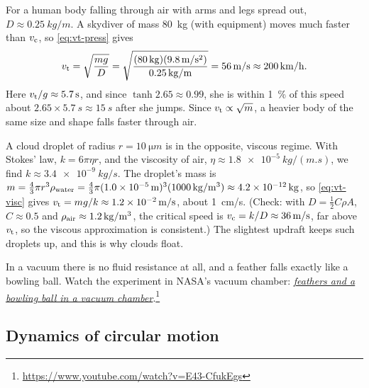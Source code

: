 \documentclass[11pt,a4paper]{article}
\begin{document}
\begin{example}
\setlength{\parskip}{0.5em plus 0.1em}%
For a human body falling through air with arms and legs spread out, $D \approx \qty{0.25}{kg/m}$. A
skydiver of mass \qty{80}{kg} (with equipment) moves much faster than $v_{\mathrm{c}}$, so
\eqref{eq:vt-press} gives
\[
  v_{\mathrm{t}} = \sqrt{\frac{mg}{D}} = \sqrt{\frac{(\qty{80}{kg})(\qty{9.8}{m/s^2})}{\qty{0.25}{kg/m}}}
  = \qty{56}{m/s} \approx \qty{200}{km/h} .
\]
Here $v_{\mathrm{t}}/g \approx \qty{5.7}{s}$, and since $\tanh 2.65 \approx 0.99$, she is within
\qty{1}{\percent} of this speed about $2.65 \times \qty{5.7}{s} \approx \qty{15}{s}$ after she jumps.
Since $v_{\mathrm{t}} \propto \sqrt{m}$, a heavier body of the same size and shape falls faster through air.

A cloud droplet of radius $r = \qty{10}{\micro m}$ is in the opposite, viscous regime. With Stokes'
law, $k = 6\pi\eta r$, and the viscosity of air, $\eta \approx \qty{1.8e-5}{kg/(m.s)}$, we find
$k \approx \qty{3.4e-9}{kg/s}$. The droplet's mass is
$m = \tfrac43\pi r^3\rho_{\mathrm{water}} = \tfrac43\pi(\qty{1.0e-5}{m})^3(\qty{1000}{kg/m^3}) \approx
\qty{4.2e-12}{kg}$, so \eqref{eq:vt-visc} gives $v_{\mathrm{t}} = mg/k \approx \qty{1.2e-2}{m/s}$, about
\qty{1}{cm/s}. (Check: with $D = \tfrac12 C\rho A$, $C \approx 0.5$ and $\rho_{\mathrm{air}} \approx
\qty{1.2}{kg/m^3}$, the critical speed is $v_{\mathrm{c}} = k/D \approx \qty{36}{m/s}$, far above $v_{\mathrm{t}}$,
so the viscous approximation is consistent.) The slightest updraft keeps such droplets
up, and this is why clouds float.
\end{example}

\begin{aside}
In a vacuum there is no fluid resistance at all, and a feather falls exactly like a bowling ball. Watch
the experiment in NASA's vacuum chamber:
\href{https://www.youtube.com/watch?v=E43-CfukEgs}{\emph{feathers and a bowling ball in a vacuum
chamber}}.\footnote{\url{https://www.youtube.com/watch?v=E43-CfukEgs}}
\end{aside}

\subsection{Dynamics of circular motion}\label{sec:circdyn}
\end{document}
